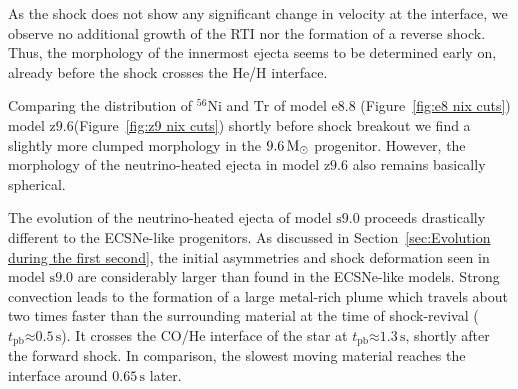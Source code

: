 \documentclass[fleqn,usenatbib]{mnras}
\newcommand{\tpb}{\ensuremath{t_{\text{pb}}}}
\newcommand{\nickel}{\ensuremath{\mathrm{^{56}Ni}}\xspace}
\newcommand{\tracer}{\ensuremath{\mathrm{Tr}}\xspace}
\newcommand{\solm}{\ensuremath{\rm{M_{\odot}}}\xspace}
\newcommand{\s}{\ensuremath{\text{s}}}
\newcommand{\onemg}{\ensuremath{\mathrm{e8.8}}\xspace}
\newcommand{\snine}{\ensuremath{\mathrm{s9.0}}\xspace}
\newcommand{\znine}{\ensuremath{\mathrm{z9.6}}\xspace}
\begin{document}
As the shock does not show any significant change in velocity at the interface, we observe 
no additional growth of the RTI nor the formation of a reverse shock.
Thus, the morphology of the innermost ejecta seems to be determined early on, already 
before the shock crosses the He/H interface.

Comparing the distribution of \nickel and \tracer of model \onemg 
(Figure~\ref{fig:e8 nix cuts}) model \znine (Figure~\ref{fig:z9 nix cuts}) 
shortly before shock breakout we find a slightly more clumped morphology in the 
$9.6\,\solm$ progenitor. However, the morphology of the neutrino-heated ejecta in 
model \znine also remains basically spherical.

The evolution of the neutrino-heated ejecta of model \snine proceeds drastically different to the ECSNe-like progenitors. 
As discussed in Section~\ref{sec:Evolution during the first second}, 
the initial asymmetries and shock deformation seen in model \snine are 
considerably larger than found in the ECSNe-like models. Strong convection leads to the formation of a large metal-rich plume which travels about two times 
faster than the surrounding material at the time of shock-revival ($\tpb\mathord{\approx} 0.5\,\s$).  
It crosses the CO/He interface of the star at $\tpb\mathord{\approx}1.3\,\s$, 
shortly after the forward shock. In comparison, the slowest 
moving material reaches the interface around $ 0.65\,\s$ later. 
\end{document}
